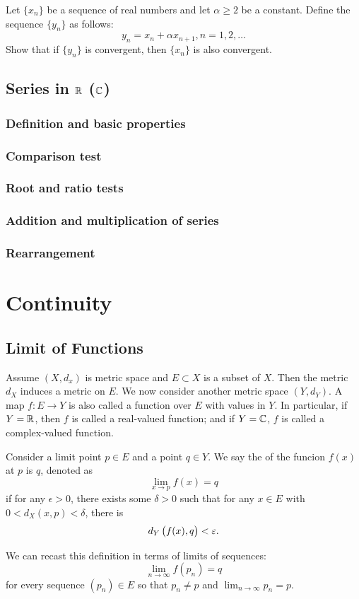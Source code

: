 \begin{prbm}
Let $\{x_n\}$ be a sequence of real numbers and let $\alpha\ge2$ be a constant. Define the sequence $\{y_n\}$ as follows:
\[ y_n=x_n+\alpha x_{n+1}, n=1,2,\dots \]
Show that if $\{y_n\}$ is convergent, then $\{x_n\}$ is also convergent.
\end{prbm}

\section{Series in $\mathbb R$ ($\mathbb C$)}
\subsection{Definition and basic properties}
\subsection{Comparison test}
\subsection{Root and ratio tests}
\subsection{Addition and multiplication of series}
\subsection{Rearrangement}


\chapter{Continuity}
\section{Limit of Functions}
Assume $(X,d_x)$ is metric space and $E\subset X$ is a subset of $X$. Then the metric $d_X$ induces a metric on $E$. We now consider another metric space $(Y,d_Y)$. A map $f:E\to Y$ is also called a function over $E$ with values in $Y$. In particular, if $Y=\mathbb R$, then $f$ is called a real-valued function; and if $Y=\mathbb C$, $f$ is called a complex-valued function.

\begin{definition}\label{defn:limit-function}
Consider a limit point $p\in E$ and a point $q\in Y$. We say the  of the funcion $f(x)$ at $p$ is $q$, denoted as
\[ \lim_{x\to p}f(x)=q \]
if for any $\epsilon>0$, there exists some $\delta>0$ such that for any $x\in E$ with $0<d_X(x,p)<\delta$, there is
\[ d_Y\left(f(x), q\right)<\varepsilon. \]
\end{definition}
We can recast this definition in terms of limits of sequences:
\[ \lim_{n\to\infty}f(p_n)=q \]
for every sequence $(p_n) \in E$ so that $p_n \neq p$ and $\lim_{n\to\infty} p_n = p$.

